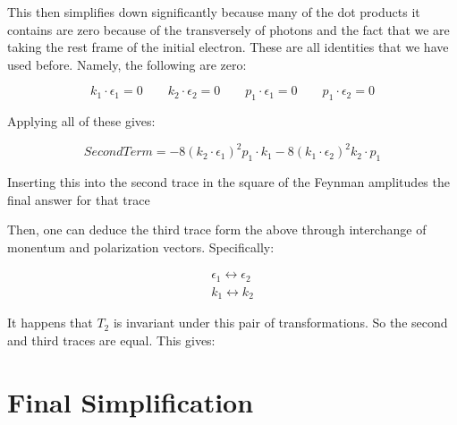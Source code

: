 \documentclass[a4]{article}
\begin{document}
    This then simplifies down significantly because many of the dot products it contains are zero because of the transversely of photons and the fact that we are taking the rest frame of the initial electron. These are all identities that we have used before. Namely, the following are zero:

    \begin{equation}
        k_1 \cdot \epsilon_1 = 0 \qquad k_2 \cdot \epsilon_2 = 0 \qquad p_1 \cdot \epsilon_1 = 0 \qquad p_1 \cdot \epsilon_2 = 0
    \end{equation}

    Applying all of these gives:

    \begin{equation}
        Second Term = - 8 (k_2 \cdot \epsilon_1)^2 p_1 \cdot k_1 - 8 (k_1 \cdot \epsilon_2)^2 k_2 \cdot p_1
    \end{equation}

    Inserting this into the second trace in the square of the Feynman amplitudes the final answer for that trace

    \begin{center}
    \end{center}

    Then, one can deduce the third trace form the above through interchange of monentum and polarization vectors. Specifically:

    \begin{equation}
        \begin{aligned}
            \epsilon_1 \leftrightarrow \epsilon_2 \\
            k_1 \leftrightarrow k_2
        \end{aligned}
    \end{equation}
    
        It happens that $T_2$ is invariant under this pair of transformations. So the second and third traces are equal. This gives:

    \begin{center}
    \end{center}

    \section*{Final Simplification}
\end{document}
